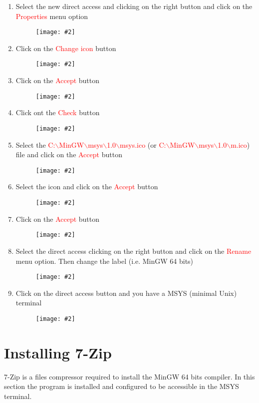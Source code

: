 \documentclass[a4paper]{article}
\newcommand{\FIG}[2]
{
	\begin{figure}[ht!]
	\centering
	\texttt{[image: \#2]}
	\end{figure}
}
\newcommand{\FIGURE}[1]{\FIG{0.35}{#1}}
\newcommand{\RED}[1] {\textcolor{red}{#1}}
\begin{document}
\begin{enumerate}
\clearpage

\item Select the new direct access and clicking on the right button and click on
the \RED{Properties} menu option
\FIGURE{msys-13.png.eps}

\item Click on the \RED{Change icon} button
\FIGURE{msys-14.png.eps}

\clearpage

\item Click on the \RED{Accept} button
\FIGURE{msys-15.png.eps}

\item Click ont the \RED{Check} button
\FIGURE{msys-16.png.eps}

\clearpage

\item Select the
\RED{C:$\backslash$MinGW$\backslash$msys$\backslash$1.0$\backslash$msys.ico} (or
\RED{C:$\backslash$MinGW$\backslash$msys$\backslash$1.0$\backslash$m.ico}) file
and click on the \RED{Accept} button
\FIGURE{msys-17.png.eps}

\item Select the icon and click on the \RED{Accept} button
\FIGURE{msys-18.png.eps}

\clearpage

\item Click on the \RED{Accept} button
\FIGURE{msys-19.png.eps}

\item Select the direct access clicking on the right button and click on the
\RED{Rename} menu option. Then change the label (i.e. MinGW 64 bits)
\FIGURE{msys-20.png.eps}

\clearpage

\item Click on the direct access button and you have a MSYS (minimal Unix)
terminal
\FIGURE{msys-21.png.eps}

\end{enumerate}

\clearpage

\section{Installing 7-Zip}

7-Zip is a files compressor required to install the MinGW 64 bits compiler. In
this section the program is installed and configured to be accessible in the
MSYS terminal.
\end{document}
